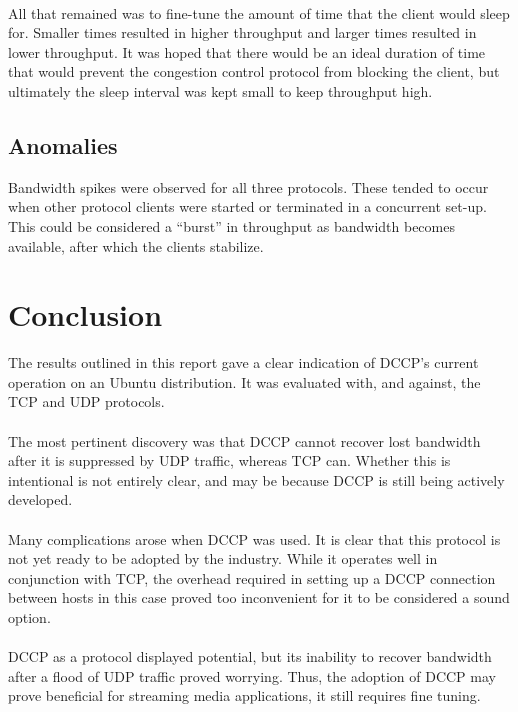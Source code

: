 \documentclass[10pt,a4paper]{article}
\begin{document}
\paragraph{}
All that remained was to fine-tune the amount of time that the client would
sleep for. Smaller times resulted
in higher throughput and larger times resulted in lower throughput. It was hoped that there would be
an ideal duration of time that would prevent the congestion control protocol from blocking the client,
but ultimately the sleep interval was kept small to keep throughput high.

\subsection{Anomalies}
\label{anom}
Bandwidth spikes were observed for all three protocols. These tended to occur when other protocol
clients were started or terminated in a concurrent set-up. This could be considered a ``burst'' 
in throughput as bandwidth becomes available, after which the clients stabilize. 

\section{Conclusion}
The results outlined in this report gave a clear indication of DCCP's
current operation on an Ubuntu distribution. It was evaluated with, and against,
the TCP and UDP protocols.
\paragraph{}
The most pertinent discovery was that DCCP cannot recover lost bandwidth after
it is suppressed by UDP traffic, whereas TCP can. Whether this is intentional
is not entirely clear, and may be because DCCP is still being actively developed. 
\paragraph{}
Many complications arose when DCCP was used. It is clear that this protocol is not
yet ready to be adopted by the industry. While it operates well in conjunction with 
TCP, the overhead required in setting up a DCCP connection between hosts in 
this case proved too inconvenient for it to be considered a sound option.
\paragraph{}
DCCP as a protocol displayed potential, but its inability to recover bandwidth after a flood
of UDP traffic proved worrying. Thus, the adoption of DCCP may prove beneficial for streaming
media applications, it still requires fine tuning. 
\end{document}
